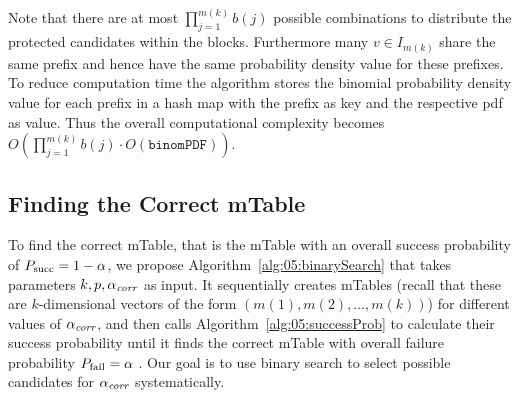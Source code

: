 Note that there are at most $\prod_{j=1}^{m(k)}b(j)$ possible combinations to distribute the protected candidates within the blocks.
%
Furthermore many $v \in I_{m(k)}$ share the same prefix and hence have the same probability density value for these prefixes.
%
To reduce computation time the algorithm stores the binomial probability density value for each prefix in a hash map with the prefix as key and the respective pdf as value.
%
Thus the overall computational complexity becomes $O(\prod_{j=1}^{m(k)}b(j) \cdot O(\texttt{binomPDF}))$.

\subsection{Finding the Correct mTable}\label{subsec:finding-mtable}
To find the correct mTable, that is the mTable with an overall success probability of $P_{\operatorname{succ}} = 1-\alpha$, we propose Algorithm~\ref{alg:05:binarySearch} that takes  parameters $k, p, \alpha_\textit{corr}$ as input.
%
%
It sequentially creates mTables (recall that these are $k$-dimensional vectors of the form $(m(1), m(2), \ldots , m(k))$) for different values of $\alpha_\textit{corr}$, and then calls Algorithm~\ref{alg:05:successProb} to calculate their success probability until it finds the correct mTable with overall failure probability $P_{\operatorname{fail}} = \alpha$ . 
%
Our goal is to use binary search to select possible candidates for $\alpha_\textit{corr}$ systematically.

